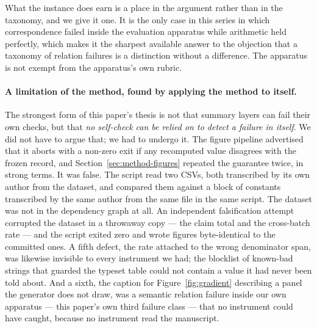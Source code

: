 \documentclass[sigconf,review]{acmart}
\begin{document}
What the instance does earn is a place in the argument rather than in the
taxonomy, and we give it one. It is the only case in this series in which
correspondence failed inside the evaluation apparatus while arithmetic held
perfectly, which makes it the sharpest available answer to the objection that
a taxonomy of relation failures is a distinction without a difference. The
apparatus is not exempt from the apparatus's own rubric.

\paragraph{A limitation of the method, found by applying the method to itself.}
\label{sec:selftest}
The strongest form of this paper's thesis is not that summary layers can fail
their own checks, but that \emph{no self-check can be relied on to detect a
failure in itself}. We did not have to argue that; we had to undergo it. The
figure pipeline advertised that it aborts with a non-zero exit if any
recomputed value disagrees with the frozen record, and Section~\ref{sec:method-figures}
repeated the guarantee twice, in strong terms. It was false. The script read
two CSVs, both transcribed by its own author from the dataset, and compared
them against a block of constants transcribed by the same author from the same
file in the same script. The dataset was not in the dependency graph at all.
An independent falsification attempt corrupted the dataset in a throwaway
copy --- the claim total and the cross-batch rate --- and the script exited
zero and wrote figures byte-identical to the committed ones. A fifth defect,
the rate attached to the wrong denominator span, was likewise invisible to
every instrument we had; the blocklist of known-bad strings that guarded the
typeset table could not contain a value it had never been told about. And a
sixth, the caption for Figure~\ref{fig:gradient} describing a panel the
generator does not draw, was a semantic relation failure inside our own
apparatus --- this paper's own third failure class --- that no instrument could
have caught, because no instrument read the manuscript.
\end{document}
